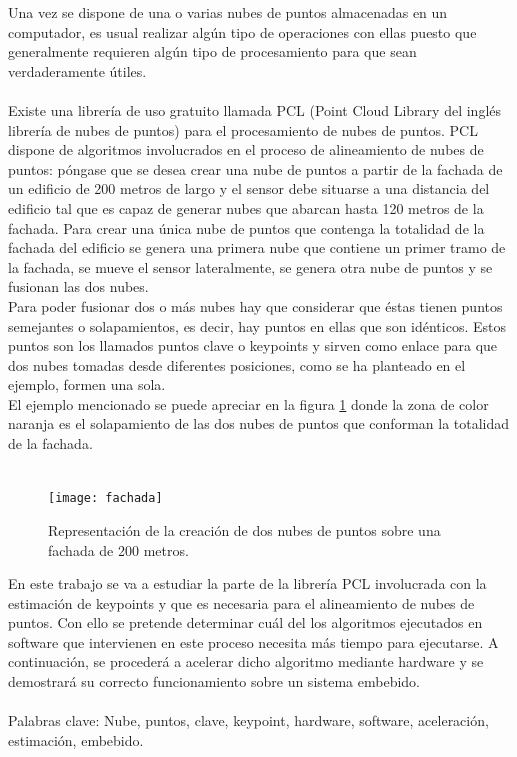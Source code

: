 \documentclass[a4paper,11pt]{book}
\begin{document}
Una vez se dispone de una o varias nubes de puntos almacenadas en un computador, es usual realizar algún tipo de operaciones con ellas puesto que generalmente requieren algún tipo de procesamiento para que sean verdaderamente útiles.
\\
\\
Existe una librería de uso gratuito llamada PCL (Point Cloud Library del inglés librería de nubes de puntos) para el procesamiento de nubes de puntos. PCL dispone de algoritmos involucrados en el proceso de alineamiento de nubes de puntos: póngase que se desea crear una nube de puntos a partir de la fachada de un edificio de 200 metros de largo y el sensor debe situarse a una distancia del edificio tal que es capaz de generar nubes que abarcan hasta 120 metros de la fachada. Para crear una única nube de puntos que contenga la totalidad de la fachada del edificio se genera una primera nube que contiene un primer tramo de la fachada, se mueve el sensor lateralmente, se genera otra nube de puntos y se fusionan las dos nubes. 
\\
Para poder fusionar dos o más nubes hay que considerar que éstas tienen puntos semejantes o solapamientos, es decir, hay puntos en ellas que son idénticos. Estos puntos son los llamados puntos clave o keypoints y sirven como enlace para que dos nubes tomadas desde diferentes posiciones, como se ha planteado en el ejemplo, formen una sola.
\\
El ejemplo mencionado se puede apreciar en la figura \ref{fig:fachada} donde la zona de color naranja es el solapamiento de las dos nubes de puntos que conforman la totalidad de la fachada.
\\
\\
\begin{figure}
\centering
\texttt{[image: fachada]}
  \caption{Representación de la creación de dos nubes de puntos sobre una fachada de 200 metros.}\label{fig:fachada}
\end{figure}
En este trabajo se va a estudiar la parte de la librería PCL involucrada con la estimación de keypoints y que es necesaria para el alineamiento de nubes de puntos. Con ello se pretende determinar cuál del los algoritmos ejecutados en software que intervienen en este proceso  necesita más tiempo para ejecutarse. A continuación, se procederá a acelerar dicho algoritmo mediante hardware y se demostrará su correcto funcionamiento sobre un sistema embebido.
\\
\\
Palabras clave: Nube, puntos, clave, keypoint, hardware, software, aceleración, estimación, embebido.
\end{document}
